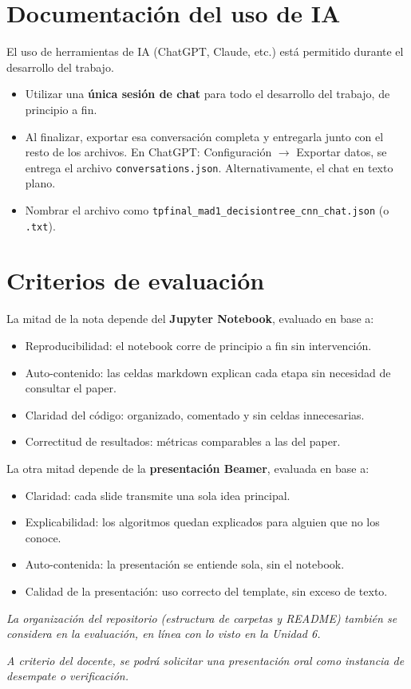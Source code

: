 \documentclass[11pt,a4paper]{article}
\newcommand{\codigo}[1]{\texttt{#1}}
\begin{document}
\section{Documentaci\'on del uso de IA}
El uso de herramientas de IA (ChatGPT, Claude, etc.) est\'a permitido durante el desarrollo del trabajo.
\begin{itemize}[leftmargin=2em,itemsep=2pt]
    \item Utilizar una \textbf{\'unica sesi\'on de chat} para todo el desarrollo del trabajo, de principio a fin.
    \item Al finalizar, exportar esa conversaci\'on completa y entregarla junto con el resto de los archivos. En ChatGPT: Configuraci\'on $\rightarrow$ Exportar datos, se entrega el archivo \codigo{conversations.json}. Alternativamente, el chat en texto plano.
    \item Nombrar el archivo como \codigo{tpfinal\_mad1\_decisiontree\_cnn\_chat.json} (o \codigo{.txt}).
\end{itemize}

\section{Criterios de evaluaci\'on}
La mitad de la nota depende del \textbf{Jupyter Notebook}, evaluado en base a:
\begin{itemize}[leftmargin=2em,itemsep=2pt]
    \item Reproducibilidad: el notebook corre de principio a fin sin intervenci\'on.
    \item Auto-contenido: las celdas markdown explican cada etapa sin necesidad de consultar el paper.
    \item Claridad del c\'odigo: organizado, comentado y sin celdas innecesarias.
    \item Correctitud de resultados: m\'etricas comparables a las del paper.
\end{itemize}

La otra mitad depende de la \textbf{presentaci\'on Beamer}, evaluada en base a:
\begin{itemize}[leftmargin=2em,itemsep=2pt]
    \item Claridad: cada slide transmite una sola idea principal.
    \item Explicabilidad: los algoritmos quedan explicados para alguien que no los conoce.
    \item Auto-contenida: la presentaci\'on se entiende sola, sin el notebook.
    \item Calidad de la presentaci\'on: uso correcto del template, sin exceso de texto.
\end{itemize}

\textit{La organizaci\'on del repositorio (estructura de carpetas y README) tambi\'en se considera en la evaluaci\'on, en l\'inea con lo visto en la Unidad 6.}

\textit{A criterio del docente, se podr\'a solicitar una presentaci\'on oral como instancia de desempate o verificaci\'on.}
\end{document}
